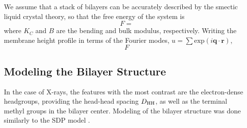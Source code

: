 We assume that a stack of bilayers can be accurately
described by the smectic liquid crystal theory, so that the free energy of 
the system is
\begin{equation}
  F = 
\end{equation}
where $K_C$ and $B$ are the bending and bulk modulus, respectively. 
Writing the membrane height profile in terms of the Fourier modes,
$u=\sum \mathrm{exp}(i\mathbf{q} \cdot \mathbf{r})$, 
\begin{equation}
  F
\end{equation}


\newpage
\subsection{Modeling the Bilayer Structure}\label{sec:SDP_method}
In the case of X-rays, the features with the most contrast are the 
electron-dense headgroups, providing the head-head spacing $D_\textrm{HH}$,
as well as the terminal methyl groups in the bilayer center.
Modeling of the bilayer structure was done similarly to the SDP model 
\cite{ref:Kucerka08}. 

